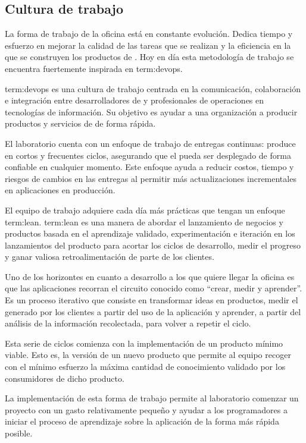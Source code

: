 \subsection{Cultura de trabajo}
\label{cultura_de_trabajo}

La forma de trabajo de la oficina está en constante evolución. Dedica tiempo y
esfuerzo en mejorar la calidad de las tareas que se realizan y la eficiencia en
la que se construyen los productos de . Hoy en día esta metodología de
trabajo se encuentra fuertemente inspirada en \gls{term:devops}.

\gls{term:devops} es una cultura de trabajo centrada en la comunicación,
colaboración e integración entre desarrolladores de  y profesionales de
operaciones en tecnologías de información. Su objetivo es ayudar a una
organización a producir productos y servicios de  de forma rápida.

El laboratorio cuenta con un enfoque de trabajo de entregas continuas: produce
en cortos y frecuentes ciclos, asegurando que el  pueda ser desplegado
de forma confiable en cualquier momento. Este enfoque ayuda a reducir costos,
tiempo y riesgos de cambios en las entregas al permitir más actualizaciones
incrementales en aplicaciones en producción.

El equipo de trabajo adquiere cada día más prácticas que tengan un enfoque
\gls{term:lean}. \gls{term:lean} es una manera de abordar el lanzamiento de
negocios y productos basada en el aprendizaje validado, experimentación e
iteración en los lanzamientos del producto para acortar los ciclos de
desarrollo, medir el progreso y ganar valiosa retroalimentación de parte de los
clientes.

Uno de los horizontes en cuanto a desarrollo a los que quiere llegar la oficina
es que las aplicaciones recorran el circuito  conocido como
“crear, medir y aprender”. Es un proceso iterativo que consiste en transformar
ideas en productos, medir el  generado por los clientes a partir
del uso de la aplicación y aprender, a partir del análisis de la información
recolectada, para volver a repetir el ciclo.

Esta serie de ciclos comienza con la implementación de un producto mínimo
viable. Esto es, la versión de un nuevo producto que permite al equipo recoger
con el mínimo esfuerzo la máxima cantidad de conocimiento validado por los
consumidores de dicho producto.

La implementación de esta forma de trabajo permite al laboratorio comenzar un
proyecto con un gasto relativamente pequeño y ayudar a los programadores a
iniciar el proceso de aprendizaje sobre la aplicación de la forma más rápida
posible\cite[p~.2]{lean:the_lean_startup}.

